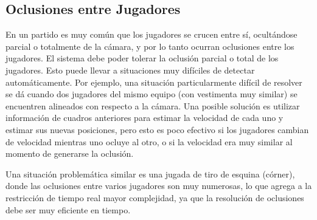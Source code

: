 
\subsection{Oclusiones entre Jugadores}

En un partido es muy común que los jugadores se crucen entre sí, ocultándose
parcial o totalmente de la cámara, y por lo tanto ocurran oclusiones entre los
jugadores. El sistema debe poder tolerar la oclusión parcial o total de los jugadores.
Esto puede llevar a situaciones muy difíciles de detectar automáticamente. Por
ejemplo, una situación particularmente difícil de resolver se dá cuando dos
jugadores del mismo equipo (con vestimenta muy similar) se encuentren alineados
con respecto a la cámara. Una posible solución es utilizar información de
cuadros anteriores para estimar la velocidad de cada uno y estimar sus nuevas
posiciones, pero esto es poco efectivo si los jugadores cambian de velocidad
mientras uno ocluye al otro, o si la velocidad era muy similar al momento de
generarse la oclusión.

Una situación problemática similar es una jugada de tiro de esquina (córner),
donde las oclusiones entre varios jugadores son muy numerosas, lo que agrega a
la restricción de tiempo real mayor complejidad, ya que la resolución de
oclusiones debe ser muy eficiente en tiempo.

